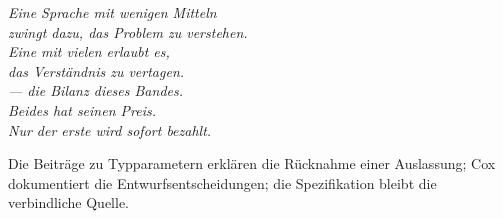 \bigskip
\begin{flushright}
\itshape\color{grau}
Eine Sprache mit wenigen Mitteln\\
zwingt dazu, das Problem zu verstehen.\\
Eine mit vielen erlaubt es,\\
das Verständnis zu vertagen.\\[10pt]
\normalfont\color{grau}\upshape
--- die Bilanz dieses Bandes.\\
\itshape Beides hat seinen Preis.\\
Nur der erste wird sofort bezahlt.
\end{flushright}
\vspace{6pt}
\noindent Die Bei\-trä\-ge zu Typ\-pa\-ra\-me\-tern erklären die Rück\-nah\-me einer Aus\-las\-sung; Cox do\-ku\-men\-tiert die Ent\-wurfs\-ent\-schei\-dun\-gen; die Spe\-zi\-fi\-ka\-tion bleibt die ver\-bind\-li\-che Quelle.
